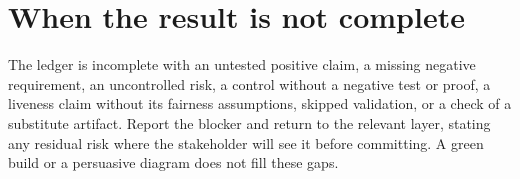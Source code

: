 \section{When the result is not complete}

The ledger is incomplete with an untested positive claim, a missing negative
requirement, an uncontrolled risk, a control without a negative test or proof, a
liveness claim without its fairness assumptions, skipped validation, or a check of a
substitute artifact. Report the blocker and return to the relevant layer, stating
any residual risk where the stakeholder will see it before committing. A green build
or a persuasive diagram does not fill these gaps.
